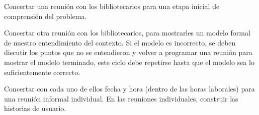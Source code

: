 Concertar una reunión con los bibliotecarios para una etapa inicial de comprensión del problema.

Concertar otra reunión con los bibliotecarios, para mostrarles un modelo formal de nuestro entendimiento del contexto. Si el modelo es incorrecto, se deben discutir los puntos que no se entendieron y volver a programar una reunión para mostrar el modelo terminado, este ciclo debe repetirse hasta que el modelo sea lo suficientemente correcto.

Concertar con cada uno de ellos fecha y hora (dentro de las horas laborales) para una reunión informal individual. En las reuniones individuales, construir las historias de usuario.
